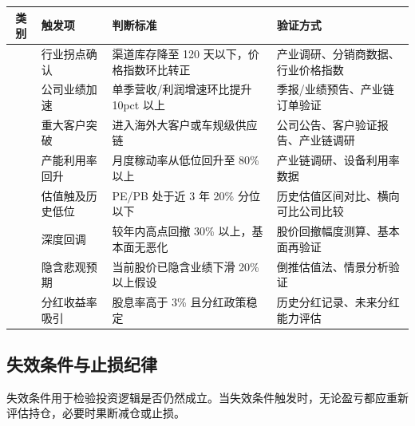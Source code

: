 \begin{exhibitbox}[表 10-4：买入触发条件清单]
\centering
\small
\begin{tabularx}{\textwidth}{c L{2.0cm} L{4.5cm} L{5.5cm}}
\toprule
\textbf{类别} & \textbf{触发项} & \textbf{判断标准} & \textbf{验证方式} \\
\midrule
{} & 行业拐点确认 & 渠道库存降至 120 天以下，价格指数环比转正 & 产业调研、分销商数据、行业价格指数 \\
& 公司业绩加速 & 单季营收/利润增速环比提升 10pct 以上 & 季报/业绩预告、产业链订单验证 \\
& 重大客户突破 & 进入海外大客户或车规级供应链 & 公司公告、客户验证报告、产业链调研 \\
& 产能利用率回升 & 月度稼动率从低位回升至 80\% 以上 & 产业链调研、设备利用率数据 \\
\midrule
{} & 估值触及历史低位 & PE/PB 处于近 3 年 20\% 分位以下 & 历史估值区间对比、横向可比公司比较 \\
& 深度回调 & 较年内高点回撤 30\% 以上，基本面无恶化 & 股价回撤幅度测算、基本面再验证 \\
& 隐含悲观预期 & 当前股价已隐含业绩下滑 20\% 以上假设 & 倒推估值法、情景分析验证 \\
& 分红收益率吸引 & 股息率高于 3\% 且分红政策稳定 & 历史分红记录、未来分红能力评估 \\
\bottomrule
\end{tabularx}
\end{exhibitbox}

\subsection{失效条件与止损纪律}

失效条件用于检验投资逻辑是否仍然成立。当失效条件触发时，无论盈亏都应重新评估持仓，必要时果断减仓或止损。

